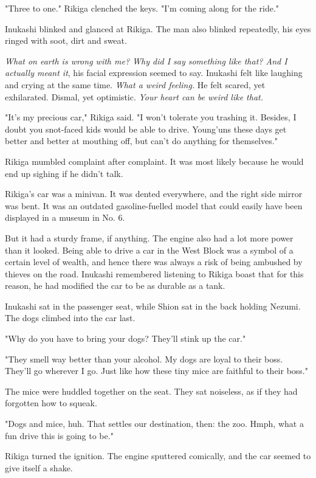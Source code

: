 "Three to one." Rikiga clenched the keys. "I'm coming along for the
ride."

Inukashi blinked and glanced at Rikiga. The man also blinked repeatedly,
his eyes ringed with soot, dirt and sweat.

\emph{What on earth is wrong with me? Why did I say something like that? And I
actually meant it}, his facial expression seemed to say. Inukashi felt
like laughing and crying at the same time. \emph{What a weird feeling.} He felt
scared, yet exhilarated. Dismal, yet optimistic. \emph{Your heart can be weird
like that.}

"It's my precious car," Rikiga said. "I won't tolerate you trashing it.
Besides, I doubt you snot-faced kids would be able to drive. Young'uns
these days get better and better at mouthing off, but can't do anything
for themselves."

Rikiga mumbled complaint after complaint. It was most likely because he
would end up sighing if he didn't talk.

Rikiga's car was a minivan. It was dented everywhere, and the right side
mirror was bent. It was an outdated gasoline-fuelled model that could
easily have been displayed in a museum in No. 6.

But it had a sturdy frame, if anything. The engine also had a lot more
power than it looked. Being able to drive a car in the West Block was a
symbol of a certain level of wealth, and hence there was always a risk
of being ambushed by thieves on the road. Inukashi remembered listening
to Rikiga boast that for this reason, he had modified the car to be as
durable as a tank.

Inukashi sat in the passenger seat, while Shion sat in the back holding
Nezumi. The dogs climbed into the car last.

"Why do you have to bring your dogs? They'll stink up the car."

"They smell way better than your alcohol. My dogs are loyal to their
boss. They'll go wherever I go. Just like how these tiny mice are
faithful to their boss."

The mice were huddled together on the seat. They sat noiseless, as if
they had forgotten how to squeak.

"Dogs and mice, huh. That settles our destination, then: the zoo. Hmph,
what a fun drive this is going to be."

Rikiga turned the ignition. The engine sputtered comically, and the car
seemed to give itself a shake.


